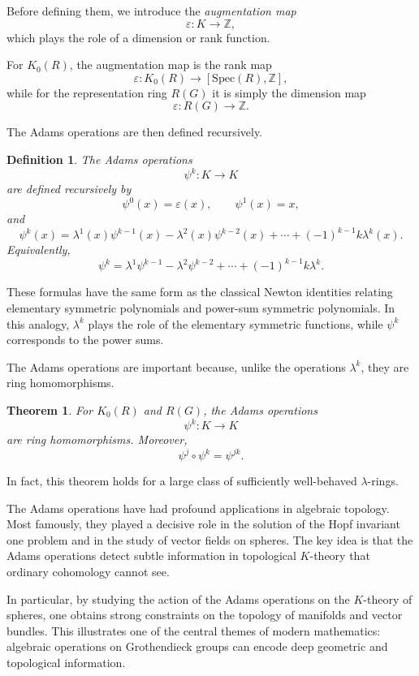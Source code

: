 \documentclass[12pt,reqno]{amsart}
\theoremstyle{plain}
\newtheorem{defn}[thm]{Definition}
\numberwithin{equation}{section}
\newtheorem{theorem}{Theorem}[section]
\begin{document}
Before defining them, we introduce the \emph{augmentation map}
\[
\varepsilon:K\to \mathbb Z,
\]
which plays the role of a dimension or rank function.

For $K_0(R)$, the augmentation map is the rank map
\[
\varepsilon:K_0(R)\to [\mathrm{Spec}(R),\mathbb Z],
\]
while for the representation ring $R(G)$ it is simply the dimension map
\[
\varepsilon:R(G)\to \mathbb Z.
\]

The Adams operations are then defined recursively.

\begin{defn}
The \emph{Adams operations}
\[
\psi^k:K\to K
\]
are defined recursively by
\[
\psi^0(x)=\varepsilon(x),
\qquad
\psi^1(x)=x,
\]
and
\[
\psi^k(x)
=
\lambda^1(x)\psi^{k-1}(x)
-
\lambda^2(x)\psi^{k-2}(x)
+\cdots
+(-1)^{k-1}k\lambda^k(x).
\]
Equivalently,
\[
\psi^k
=
\lambda^1\psi^{k-1}
-
\lambda^2\psi^{k-2}
+\cdots
+
(-1)^{k-1}k\lambda^k.
\]
\end{defn}

These formulas have the same form as     the classical Newton identities relating elementary symmetric polynomials and power-sum symmetric polynomials. In this analogy, $\lambda^k$
plays the role of the elementary symmetric functions, while $\psi^k$ corresponds to the power sums.

The Adams operations are important because, unlike the operations $\lambda^k$, they are ring homomorphisms.

\begin{theorem}
For $K_0(R)$ and $R(G)$, the Adams operations
\[
\psi^k:K\to K
\]
are ring homomorphisms. Moreover,
\[
\psi^j\circ \psi^k
=
\psi^{jk}.
\]
\end{theorem}

In fact, this theorem holds for a large class of sufficiently well-behaved $\lambda$-rings.

\medskip

The Adams operations have had profound applications in algebraic topology. Most famously, they played a decisive role in the solution of the Hopf invariant one problem and in the study of vector fields on spheres. The key idea is that the Adams operations detect subtle information in topological $K$-theory that ordinary cohomology cannot see.

In particular, by studying the action of the Adams operations on the $K$-theory of spheres, one obtains strong constraints on the topology of manifolds and vector bundles. This illustrates one of the central themes of modern mathematics: algebraic operations on Grothendieck groups can encode deep geometric and topological information.
\end{document}

